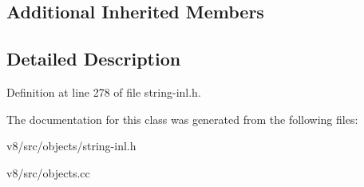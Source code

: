 \subsection*{Additional Inherited Members}


\subsection{Detailed Description}


Definition at line 278 of file string-\/inl.\+h.



The documentation for this class was generated from the following files\+:\begin{DoxyCompactItemize}
\item 
v8/src/objects/string-\/inl.\+h\item 
v8/src/objects.\+cc\end{DoxyCompactItemize}
